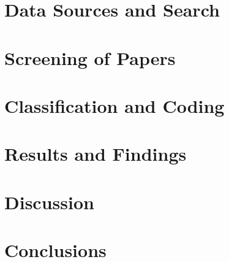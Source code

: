\documentclass[runningheads,a4paper]{llncs}
\begin{document}
\section{Data Sources and Search}


\section{Screening of Papers}


\section{Classification and Coding}


\section{Results and Findings}


\section{Discussion}


\section{Conclusions}




% 


\end{document}
